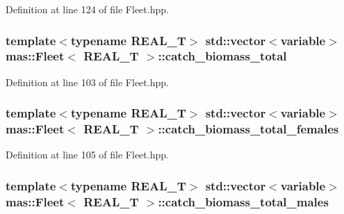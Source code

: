 Definition at line 124 of file Fleet.\-hpp.

\hypertarget{structmas_1_1_fleet_aec96c786b81fb4cf0d908de0297cc2f4}{
\subsubsection[{catch\-\_\-biomass\-\_\-total}]{\setlength{\rightskip}{0pt plus 5cm}template$<$typename R\-E\-A\-L\-\_\-\-T$>$ std\-::vector$<${\bf variable}$>$ {\bf mas\-::\-Fleet}$<$ R\-E\-A\-L\-\_\-\-T $>$\-::catch\-\_\-biomass\-\_\-total}}\label{structmas_1_1_fleet_aec96c786b81fb4cf0d908de0297cc2f4}


Definition at line 103 of file Fleet.\-hpp.

\hypertarget{structmas_1_1_fleet_a25f8a76ca51ac7bf920d94d8d3c122c7}{
\subsubsection[{catch\-\_\-biomass\-\_\-total\-\_\-females}]{\setlength{\rightskip}{0pt plus 5cm}template$<$typename R\-E\-A\-L\-\_\-\-T$>$ std\-::vector$<${\bf variable}$>$ {\bf mas\-::\-Fleet}$<$ R\-E\-A\-L\-\_\-\-T $>$\-::catch\-\_\-biomass\-\_\-total\-\_\-females}}\label{structmas_1_1_fleet_a25f8a76ca51ac7bf920d94d8d3c122c7}


Definition at line 105 of file Fleet.\-hpp.

\hypertarget{structmas_1_1_fleet_a9ff1f7b831b4297a0241ce24f83b9e0f}{
\subsubsection[{catch\-\_\-biomass\-\_\-total\-\_\-males}]{\setlength{\rightskip}{0pt plus 5cm}template$<$typename R\-E\-A\-L\-\_\-\-T$>$ std\-::vector$<${\bf variable}$>$ {\bf mas\-::\-Fleet}$<$ R\-E\-A\-L\-\_\-\-T $>$\-::catch\-\_\-biomass\-\_\-total\-\_\-males}}\label{structmas_1_1_fleet_a9ff1f7b831b4297a0241ce24f83b9e0f}


